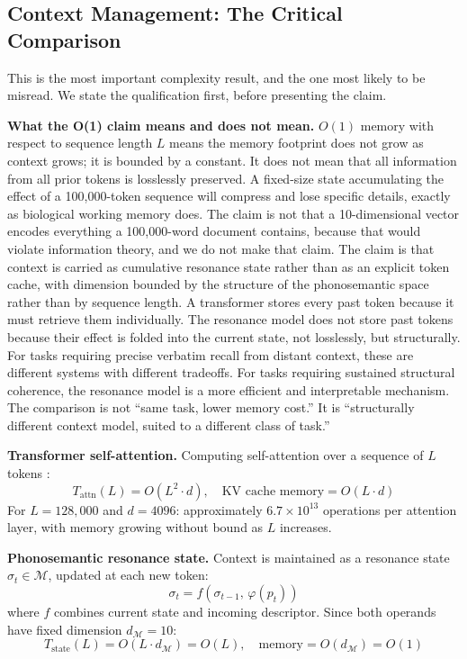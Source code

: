 \documentclass[12pt]{article}
\begin{document}
\subsection{Context Management: The Critical Comparison}

This is the most important complexity result, and the one most likely to be misread. We state the qualification first, before presenting the claim.

\textbf{What the O(1) claim means and does not mean.} $O(1)$ memory with respect to sequence length $L$ means the memory footprint does not grow as context grows; it is bounded by a constant. It does not mean that all information from all prior tokens is losslessly preserved. A fixed-size state accumulating the effect of a 100,000-token sequence will compress and lose specific details, exactly as biological working memory does. The claim is not that a 10-dimensional vector encodes everything a 100,000-word document contains, because that would violate information theory, and we do not make that claim. The claim is that context is carried as cumulative resonance state rather than as an explicit token cache, with dimension bounded by the structure of the phonosemantic space rather than by sequence length. A transformer stores every past token because it must retrieve them individually. The resonance model does not store past tokens because their effect is folded into the current state, not losslessly, but structurally. For tasks requiring precise verbatim recall from distant context, these are different systems with different tradeoffs. For tasks requiring sustained structural coherence, the resonance model is a more efficient and interpretable mechanism. The comparison is not ``same task, lower memory cost.'' It is ``structurally different context model, suited to a different class of task.''

\textbf{Transformer self-attention.}
Computing self-attention over a sequence of $L$ tokens \citep{vaswani2017}:
\[
T_\text{attn}(L) = O(L^2 \cdot d), \quad \text{KV cache memory} = O(L \cdot d)
\]
For $L = 128{,}000$ and $d = 4096$: approximately $6.7 \times 10^{13}$ operations per attention layer, with memory growing without bound as $L$ increases.

\textbf{Phonosemantic resonance state.}
Context is maintained as a resonance state $\sigma_t \in \mathcal{M}$, updated at each new token:
\[
\sigma_t = f(\sigma_{t-1},\, \varphi(p_t))
\]
where $f$ combines current state and incoming descriptor. Since both operands have fixed dimension $d_\mathcal{M} = 10$:
\[
T_\text{state}(L) = O(L \cdot d_\mathcal{M}) = O(L), \quad \text{memory} = O(d_\mathcal{M}) = O(1)
\]
\end{document}
